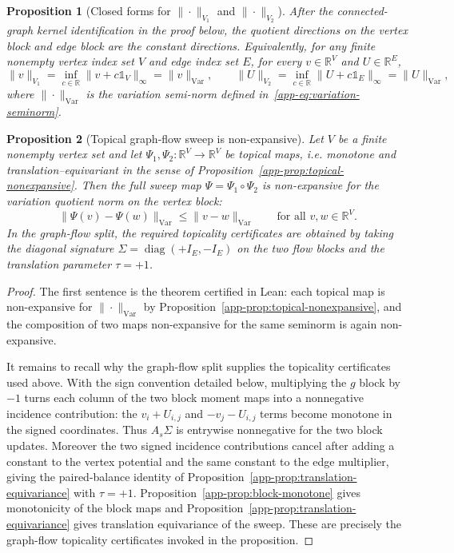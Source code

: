 \documentclass{article}
\theoremstyle{plain}
\newtheorem{proposition}{Proposition}[section]
\newcommand{\ones}{\mathds{1}}
\newcommand{\Edge}{E}
\newcommand{\RR}{\mathbb{R}}
\newcommand{\norm}[1]{\|#1\|}
\newcommand{\normVar}[1]{\norm{#1}_{\mathrm{Var}}}
\begin{document}
\begin{proposition}[Closed forms for $\|\cdot\|_{V_1}$ and $\|\cdot\|_{V_2}$]
\label{prop:graphw1-v1v2-closed-form}
After the connected-graph kernel identification in the proof below, the quotient directions
on the vertex block and edge block are the constant directions. Equivalently, for any
finite nonempty vertex index set $V$ and edge index set $E$, for every
$v\in\RR^V$ and $U\in\RR^E$,
\[
  \|v\|_{V_1}
  = \inf_{c\in\RR}\|v+c\ones_V\|_\infty
  = \normVar{v},
  \qquad
  \|U\|_{V_2}
  = \inf_{c\in\RR}\|U+c\ones_E\|_\infty
  = \normVar{U},
\]
where $\normVar{\cdot}$ is the variation semi-norm defined
in~\eqref{app-eq:variation-seminorm}.
\end{proposition}

\begin{proposition}[Topical graph-flow sweep is non-expansive]
\label{prop:graphw1-signed-structure}
Let $V$ be a finite nonempty vertex set and let
$\Psi_1,\Psi_2:\RR^V\to\RR^V$ be topical maps, i.e. monotone and
translation--equivariant in the sense of Proposition~\ref{app-prop:topical-nonexpansive}.
Then the full sweep map $\Psi=\Psi_1\circ\Psi_2$ is non-expansive for the
variation quotient norm on the vertex block:
\[
  \normVar{\Psi(v)-\Psi(w)}
  \le
  \normVar{v-w}
  \qquad\text{for all }v,w\in\RR^V .
\]
In the graph-flow split, the required topicality certificates are obtained by taking
the diagonal signature $\Sigma=\operatorname{diag}(+I_{\Edge},-I_{\Edge})$ on
the two flow blocks and the translation parameter $\tau=+1$.
\end{proposition}

\begin{proof}
The first sentence is the theorem certified in Lean: each topical map is
non-expansive for $\normVar{\cdot}$ by Proposition~\ref{app-prop:topical-nonexpansive},
and the composition of two maps non-expansive for the same seminorm is again
non-expansive.

It remains to recall why the graph-flow split supplies the topicality certificates
used above. With the sign convention detailed below, multiplying the $g$ block by
$-1$ turns each column of the two block moment maps into a nonnegative incidence
contribution: the $v_i+U_{i,j}$ and $-v_j-U_{i,j}$ terms become monotone in the
signed coordinates. Thus $A_s\Sigma$ is entrywise nonnegative for the two block
updates. Moreover the two signed incidence contributions cancel after adding a
constant to the vertex potential and the same constant to the edge multiplier,
giving the paired-balance identity of Proposition~\ref{app-prop:translation-equivariance}
with $\tau=+1$. Proposition~\ref{app-prop:block-monotone} gives monotonicity of
the block maps and Proposition~\ref{app-prop:translation-equivariance} gives
translation equivariance of the sweep. These are precisely the graph-flow
topicality certificates invoked in the proposition.
\end{proof}
\end{document}
